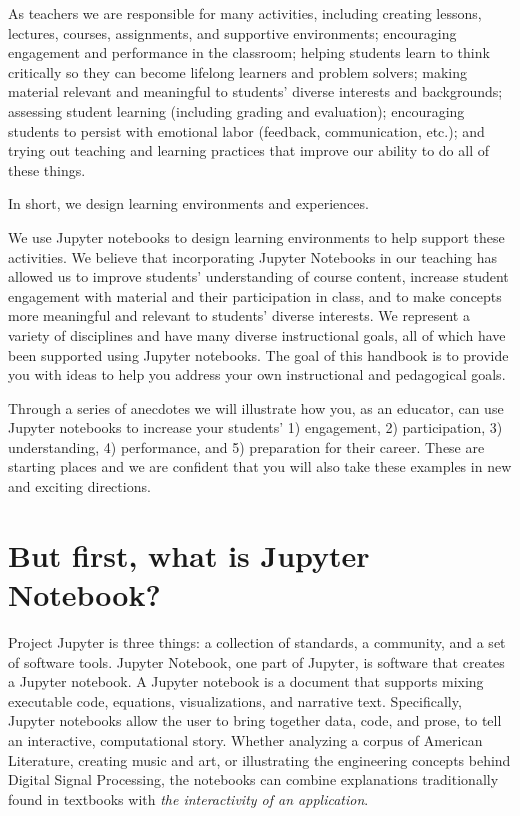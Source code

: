 \documentclass[]{book}
\begin{document}
As teachers we are responsible for many activities, including creating
lessons, lectures, courses, assignments, and supportive environments;
encouraging engagement and performance in the classroom; helping
students learn to think critically so they can become lifelong learners
and problem solvers; making material relevant and meaningful to
students' diverse interests and backgrounds; assessing student learning
(including grading and evaluation); encouraging students to persist with
emotional labor (feedback, communication, etc.); and trying out teaching
and learning practices that improve our ability to do all of these
things.

In short, we design learning environments and experiences.

We use Jupyter notebooks to design learning environments to help support
these activities. We believe that incorporating Jupyter Notebooks in our
teaching has allowed us to improve students' understanding of course
content, increase student engagement with material and their
participation in class, and to make concepts more meaningful and
relevant to students' diverse interests. We represent a variety of
disciplines and have many diverse instructional goals, all of which have
been supported using Jupyter notebooks. The goal of this handbook is to
provide you with ideas to help you address your own instructional and
pedagogical goals.

Through a series of anecdotes we will illustrate how you, as an
educator, can use Jupyter notebooks to increase your students' 1)
engagement, 2) participation, 3) understanding, 4) performance, and 5)
preparation for their career. These are starting places and we are
confident that you will also take these examples in new and exciting
directions.

\section{But first, what is Jupyter
Notebook?}\label{but-first-what-is-jupyter-notebook}

Project Jupyter is three things: a collection of standards, a community,
and a set of software tools. Jupyter Notebook, one part of Jupyter, is
software that creates a Jupyter notebook. A Jupyter notebook is a
document that supports mixing executable code, equations,
visualizations, and narrative text. Specifically, Jupyter notebooks
allow the user to bring together data, code, and prose, to tell an
interactive, computational story. Whether analyzing a corpus of American
Literature, creating music and art, or illustrating the engineering
concepts behind Digital Signal Processing, the notebooks can combine
explanations traditionally found in textbooks with \emph{the
interactivity of an application}.
\end{document}
